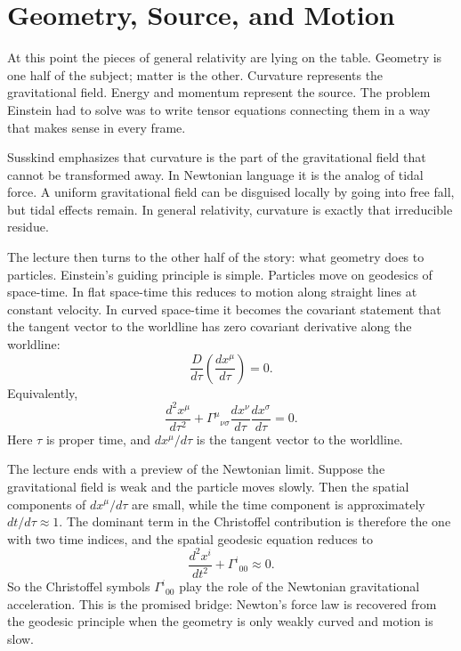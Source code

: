 \section{Geometry, Source, and Motion}

At this point the pieces of general relativity are lying on the table. Geometry is one half of the subject; matter is the other. Curvature represents the gravitational field. Energy and momentum represent the source. The problem Einstein had to solve was to write tensor equations connecting them in a way that makes sense in every frame.

Susskind emphasizes that curvature is the part of the gravitational field that cannot be transformed away. In Newtonian language it is the analog of tidal force. A uniform gravitational field can be disguised locally by going into free fall, but tidal effects remain. In general relativity, curvature is exactly that irreducible residue.

The lecture then turns to the other half of the story: what geometry does to particles. Einstein's guiding principle is simple. Particles move on geodesics of space-time. In flat space-time this reduces to motion along straight lines at constant velocity. In curved space-time it becomes the covariant statement that the tangent vector to the worldline has zero covariant derivative along the worldline:
\begin{equation}
\frac{D}{d\tau}\left(\frac{dx^\mu}{d\tau}\right)=0.
\end{equation}
Equivalently,
\begin{equation}
\frac{d^2x^\mu}{d\tau^2}
+
\Gamma^\mu{}_{\nu\sigma}
\frac{dx^\nu}{d\tau}
\frac{dx^\sigma}{d\tau}
=0.
\end{equation}
Here \(\tau\) is proper time, and \(dx^\mu/d\tau\) is the tangent vector to the worldline.

The lecture ends with a preview of the Newtonian limit. Suppose the gravitational field is weak and the particle moves slowly. Then the spatial components of \(dx^\mu/d\tau\) are small, while the time component is approximately \(dt/d\tau\approx 1\). The dominant term in the Christoffel contribution is therefore the one with two time indices, and the spatial geodesic equation reduces to
\begin{equation}
\frac{d^2x^i}{dt^2}+\Gamma^i{}_{00}\approx 0.
\end{equation}
So the Christoffel symbols \(\Gamma^i{}_{00}\) play the role of the Newtonian gravitational acceleration. This is the promised bridge: Newton's force law is recovered from the geodesic principle when the geometry is only weakly curved and motion is slow.

